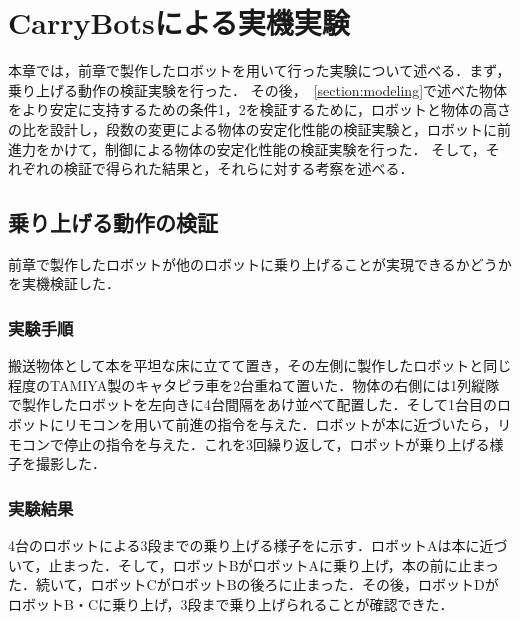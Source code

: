\chapter{CarryBotsによる実機実験}
本章では，前章で製作したロボットを用いて行った実験について述べる．まず，乗り上げる動作の検証実験を行った．
その後，~\ref{section:modeling}で述べた物体をより安定に支持するための条件1，2を検証するために，ロボットと物体の高さの比を設計し，段数の変更による物体の安定化性能の検証実験と，ロボットに前進力をかけて，制御による物体の安定化性能の検証実験を行った．
そして，それぞれの検証で得られた結果と，それらに対する考察を述べる．

\section{乗り上げる動作の検証}
前章で製作したロボットが他のロボットに乗り上げることが実現できるかどうかを実機検証した．

\subsection{実験手順}
搬送物体として本を平坦な床に立てて置き，その左側に製作したロボットと同じ程度のTAMIYA製のキャタピラ車を2台重ねて置いた．物体の右側には1列縦隊で製作したロボットを左向きに4台間隔をあけ並べて配置した．そして1台目のロボットにリモコンを用いて前進の指令を与えた．ロボットが本に近づいたら，リモコンで停止の指令を与えた．これを3回繰り返して，ロボットが乗り上げる様子を撮影した．

\subsection{実験結果}
4台のロボットによる3段までの乗り上げる様子をに示す．ロボットAは本に近づいて，止まった．そして，ロボットBがロボットAに乗り上げ，本の前に止まった．続いて，ロボットCがロボットBの後ろに止まった．その後，ロボットDがロボットB・Cに乗り上げ，3段まで乗り上げられることが確認できた．

